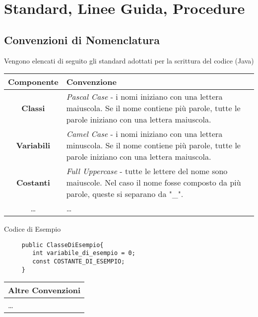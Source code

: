 \documentclass{article}
\begin{document}
\section{Standard, Linee Guida, Procedure}
\subsection{Convenzioni di Nomenclatura}
Vengono elencati di seguito gli standard adottati per la scrittura del codice (Java)
\begin{center}
    \begin{longtable}{cp{200pt}}
        \toprule
        \textbf{Componente} & \textbf{Convenzione} \\
        \midrule
        \textbf{Classi} & \textit{Pascal Case} -  i nomi iniziano con una lettera maiuscola. Se il nome contiene più parole, tutte le parole iniziano con una lettera maiuscola. \\
        \textbf{Variabili} & \textit{Camel Case} - i nomi iniziano con una lettera minuscola. Se il nome contiene più parole, tutte le parole iniziano con una lettera maiuscola.  \\
        \textbf{Costanti} & \textit{Full Uppercase} - tutte le lettere del nome sono maiuscole. Nel caso il nome fosse composto da più parole, queste si separano da "\_". \\
        \dots & \dots \\
        \bottomrule
    \end{longtable}
\end{center}

\begin{code*}{Codice di Esempio}{}

\begin{verbatim}
     public ClasseDiEsempio{
        int variabile_di_esempio = 0;
        const COSTANTE_DI_ESEMPIO;
     }
\end{verbatim}
 
\end{code*}

\begin{center}
    \begin{longtable}{p{260pt}}
        \toprule
        \textbf{Altre Convenzioni} \\
        \midrule
        
        \dots \\
        \bottomrule
    \end{longtable}
\end{center}
\end{document}
